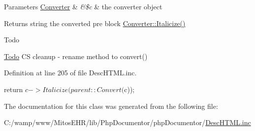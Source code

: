 \begin{DoxyParams}[1]{\-Parameters}
\hyperlink{class_converter}{\-Converter} & {\em \&\$c} & the converter object\\
\hline
\end{DoxyParams}
\begin{DoxyReturn}{\-Returns}
string the converted pre block  \hyperlink{class_converter_ae86737e1b3c05277bdd56723bc821c7d}{\-Converter\-::\-Italicize()} 
\end{DoxyReturn}
\begin{DoxyRefDesc}{\-Todo}
\item[\hyperlink{todo__todo000035}{\-Todo}]\-C\-S cleanup -\/ rename method to convert() \end{DoxyRefDesc}


\-Definition at line 205 of file \-Desc\-H\-T\-M\-L.\-inc.


\begin{DoxyCode}
    {
        return $c->Italicize(parent::Convert($c));
    }
\end{DoxyCode}


\-The documentation for this class was generated from the following file\-:\begin{DoxyCompactItemize}
\item 
\-C\-:/wamp/www/\-Mitos\-E\-H\-R/lib/\-Php\-Documentor/php\-Documentor/\hyperlink{_desc_h_t_m_l_8inc}{\-Desc\-H\-T\-M\-L.\-inc}\end{DoxyCompactItemize}
